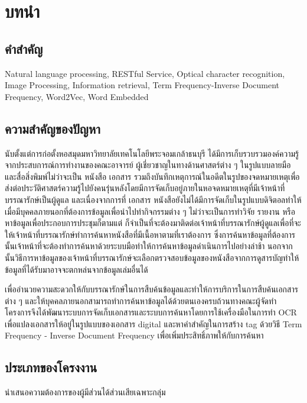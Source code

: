 \chapter{บทนำ}

\section{คำสำคัญ}

Natural language processing, RESTful Service, Optical character recognition, Image Processing, Information retrieval, Term Frequency-Inverse Document Frequency, Word2Vec, Word Embedded 

\section{ความสำคัญของปัญหา}

นับตั้งแต่การก่อตั้งหอสมุดมหาวิทยาลัยเทคโนโลยีพระจอมเกล้าธนบุรี ได้มีการเก็บรวบรวมองค์ความรู้จากประสบการณ์การทำงานของคณะอาจารย์ ผู้เชี่ยวชาญในทางด้านศาสตร์ต่าง ๆ ในรูปแบบลายมือและสื่อสิ่งพิมพ์ไม่ว่าจะเป็น หนังสือ เอกสาร รวมถึงบันทึกเหตุการณ์ในอดีตในรูปของจดหมายเหตุเพื่อส่งต่อประวัติศาสตร์ความรู้ไปยังคนรุ่นหลังโดยมีการจัดเก็บอยู่ภายในหอจดหมายเหตุที่มีเจ้าหน้าที่บรรณารักษ์เป็นผู้ดูแล และเนื่องจากการที่ เอกสาร หนังสือยังไม่ได้มีการจัดเก็บในรูปแบบดิจิตอลทำให้เมื่อมีบุคคลภายนอกที่ต้องการข้อมูลเพื่อนำไปทำกิจกรรมต่าง ๆ ไม่ว่าจะเป็นการทำวิจัย รายงาน หรือหาข้อมูลเพื่อประกอบการประชุมก็ตามแต่ ก็จำเป็นที่จะต้องมาติดต่อเจ้าหน้าที่บรรณารักษ์ผู้ดูแลเพื่อที่จะให้เจ้าหน้าที่บรรณารักษ์ทำการค้นหาหนังสือที่มีเนื้อหาตามที่เราต้องการ ซึ่งการค้นหาข้อมูลที่ต้องการนั้นเจ้าหน้าที่จะต้องทำการค้นหาด้วยระบบมือทำให้การค้นหาข้อมูลดำเนินการไปอย่างล่าช้า นอกจากนั้นวิธีการหาข้อมูลของเจ้าหน้าที่บรรณารักษ์จะเลือกตรวจสอบข้อมูลของหนังสือจากการดูสารบัญทำให้ข้อมูลที่ได้รับมาอาจจะตกหล่นจากข้อมูลเล่มอื่นได้ 

เพื่ออำนวยความสะดวกให้กับบรรณารักษ์ในการสืบค้นข้อมูลและทำให้การบริการในการสืบค้นเอกสารต่าง ๆ และให้บุคคลภายนอกสามารถทำการค้นหาข้อมูลได้ด้วยตนเองครบถ้วนทางคณะผู้จัดทำโครงการจึงได้พัฒนาระบบการจัดเก็บเอกสารและระบบการค้นหาโดยการใช้เครื่องมือในการทำ OCR เพื่อแปลงเอกสารให้อยู่ในรูปแบบของเอกสาร digital และหาคำสำคัญในการสร้าง tag ด้วยวิธี Term Frequency - Inverse Document Frequency เพื่อเพิ่มประสิทธิ์ภาพให้กับการค้นหา 

\section{ประเภทของโครงงาน}

นำเสนอความต้องการของผู้มีส่วนได้ส่วนเสียเฉพาะกลุ่ม 

